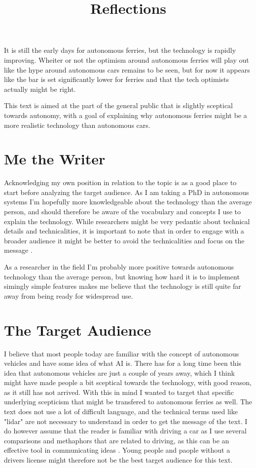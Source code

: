 \documentclass{iopconfser}
\begin{document}
It is still the early days for autonomous ferries, but the technology is rapidly improving. 
Wheiter or not the optimism around autonomous ferries will play out like the hype around autonomous cars remains to be seen, but for now it appears like the bar is set significantly lower for ferries and that the tech optimists actually might be right.

\title{Reflections}
This text is aimed at the part of the general public that is slightly sceptical towards autonomy, with a goal of explaining why autonomous ferries might be a more realistic technology than autonomous cars.

\section*{Me the Writer}
Acknowledging my own position in relation to the topic is as a good place to start before analyzing the target audience.
As I am taking a PhD in autonomous systems I'm hopefully more knowledgeable about the technology than the average person, and should therefore be aware of the vocabulary and concepts I use to explain the technology.
While researchers might be very pedantic about technical details and technicalities, it is important to note that in order to engage with a broader audience it might be better to avoid the technicalities and focus on the message \cite{kulykPeopleWantReassurance2023}.

As a researcher in the field I'm probably more positive towards autonomous technology than the average person, but knowing how hard it is to implement simingly simple features makes me believe that the technology is still quite far away from being ready for widespread use.

\section*{The Target Audience}
I believe that most people today are familiar with the concept of autonomous vehicles and have some idea of what AI is.
There has for a long time been this idea that autonomous vehicles are just a couple of years away, which I think might have made people a bit sceptical towards the technology, with good reason, as it still has not arrived.
With this in mind I wanted to target that specific underlying scepticism that might be transfered to autonomous ferries as well.
The text does not use a lot of difficult language, and the technical terms used like "lidar" are not necessary to understand in order to get the message of the text.
I do however assume that the reader is familiar with driving a car as I use several comparisons and methaphors that are related to driving, as this can be an effective tool in communicating ideas \cite{gustafssonCognitiveLinguisticsScience2024}.
Young people and paople without a drivers license might therefore not be the best target audience for this text.
\end{document}
